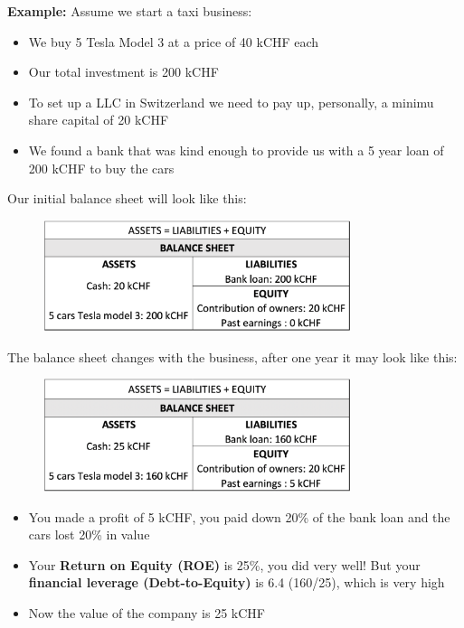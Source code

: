 \documentclass[a4paper]{extarticle}
\begin{document}
\begin{ebox}
    \textbf{Example:} Assume we start a taxi business:

    \begin{itemize}
        \item We buy 5 Tesla Model 3 at a price of 40 kCHF each
        \item Our total investment is 200 kCHF
        \item To set up a LLC in Switzerland we need to pay up, personally, a minimu share capital of 20 kCHF
        \item We found a bank that was kind enough to provide us with a 5 year loan of 200 kCHF to buy the cars
    \end{itemize}

    Our initial balance sheet will look like this:

    \begin{figure}[H]
        \includegraphics[width=9cm]{../images/EnpRisk_Fig3-2}
        \centering
    \end{figure}

    The balance sheet changes with the business, after one year it may look like this:

    \begin{figure}[H]
        \includegraphics[width=9cm]{../images/EnpRisk_Fig3-3}
        \centering
    \end{figure}

    \begin{itemize}
        \item You made a profit of 5 kCHF, you paid down 20\% of the bank loan and the cars lost 20\% in value
        \item Your \textbf{Return on Equity (ROE)} is 25\%, you did very well! But your \textbf{financial leverage (Debt-to-Equity)} is 6.4 (160/25), which is very high
        \item Now the value of the company is 25 kCHF
    \end{itemize}


\end{ebox}
\end{document}
